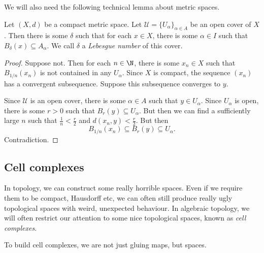 \documentclass[a4paper]{article}
\begin{document}
We will also need the following technical lemma about metric spaces.

\begin{lemma}
  Let $(X, d)$ be a compact metric space. Let $\mathcal{U} = \{U_\alpha\}_{\alpha \in A}$ be an open cover of $X$. Then there is some $\delta$ such that for each $x \in X$, there is some $\alpha \in I$ such that $B_\delta(x) \subseteq A_\alpha$. We call $\delta$ a \emph{Lebesgue number} of this cover.
\end{lemma}

\begin{proof}
  Suppose not. Then for each $n \in \N$, there is some $x_n \in X$ such that $B_{1/n} (x_n)$ is not contained in any $U_\alpha$. Since $X$ is compact, the sequence $(x_n)$ has a convergent subsequence. Suppose this subsequence converges to $y$.

  Since $\mathcal{U}$ is an open cover, there is some $\alpha \in A$ such that $y \in U_\alpha$. Since $U_\alpha$ is open, there is some $r > 0$ such that $B_r(y) \subseteq U_\alpha$. But then we can find a sufficiently large $n$ such that $\frac{1}{n} < \frac{r}{2}$ and $d(x_n, y) < \frac{r}{2}$. But then
  \[
    B_{1/n}(x_n) \subseteq B_r(y) \subseteq U_\alpha.
  \]
  Contradiction.
\end{proof}

\subsection{Cell complexes}
In topology, we can construct some really horrible spaces. Even if we require them to be compact, Hausdorff etc, we can often still produce really ugly topological spaces with weird, unexpected behaviour. In algebraic topology, we will often restrict our attention to some nice topological spaces, known as \emph{cell complexes}.

To build cell complexes, we are not just gluing maps, but spaces.
\end{document}
